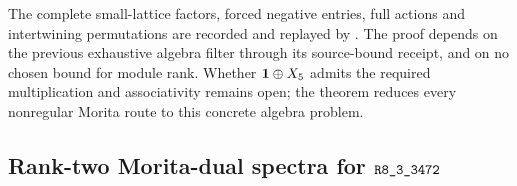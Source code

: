 The complete small-lattice factors, forced negative entries, full
actions and intertwining permutations are recorded and replayed by
.
The proof depends on the previous exhaustive algebra filter through
its source-bound receipt, and on no chosen bound for module rank.
Whether $\mathbf1\oplus X_5$ admits the required multiplication and
associativity remains open; the theorem reduces every nonregular
Morita route to this concrete algebra problem.

\subsection{Rank-two Morita-dual spectra for
\texorpdfstring{$\sha{R8_3_3472}$}{R8-3-3472}}
\label{subsec:research-r3472-dual-spectra}

